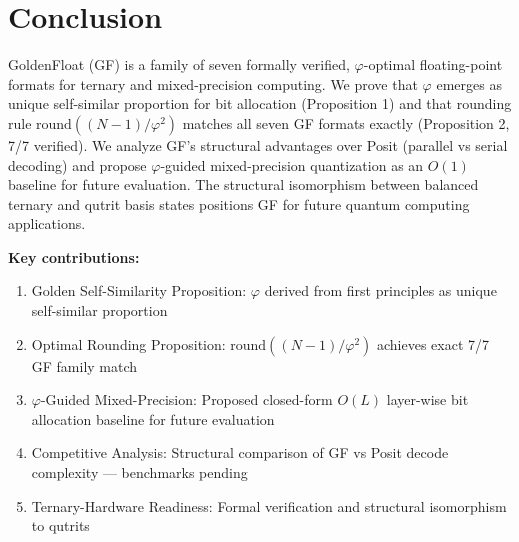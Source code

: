 \documentclass{article}
\begin{document}
\section{Conclusion}

GoldenFloat (GF) is a family of seven formally verified, $\varphi$-optimal floating-point formats for ternary and mixed-precision computing. We prove that $\varphi$ emerges as unique self-similar proportion for bit allocation (Proposition 1) and that rounding rule $\text{round}((N-1)/\varphi^2)$ matches all seven GF formats exactly (Proposition 2, 7/7 verified). We analyze GF's structural advantages over Posit (parallel vs serial decoding) and propose $\varphi$-guided mixed-precision quantization as an $O(1)$ baseline for future evaluation. The structural isomorphism between balanced ternary and qutrit basis states positions GF for future quantum computing applications.

\textbf{Key contributions:}
\begin{enumerate}
    \item Golden Self-Similarity Proposition: $\varphi$ derived from first principles as unique self-similar proportion
    \item Optimal Rounding Proposition: $\text{round}((N-1)/\varphi^2)$ achieves exact 7/7 GF family match
    \item $\varphi$-Guided Mixed-Precision: Proposed closed-form $O(L)$ layer-wise bit allocation baseline for future evaluation
    \item Competitive Analysis: Structural comparison of GF vs Posit decode complexity --- benchmarks pending
    \item Ternary-Hardware Readiness: Formal verification and structural isomorphism to qutrits
\end{enumerate}




\end{document}
